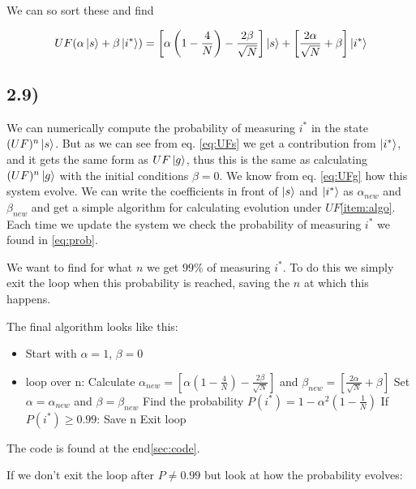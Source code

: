 \documentclass[a4paper,norsk, 10pt]{article}
\begin{document}
We can so sort these and find 

\begin{equation}
UF(\alpha\ket{s} + \beta\ket{i^*}) = \left[\alpha\left(1 - \frac{4}{N}\right) - \frac{2\beta}{\sqrt{N}}\right]\ket{s} + \left[\frac{2\alpha}{\sqrt{N}} + \beta\right]\ket{i^*}
\end{equation}\label{eq:UFg}

\subsection{2.9)}

We can numerically compute the probability of measuring $i^*$ in the state $(UF)^n\ket{s}$. But as we can see from eq. \eqref{eq:UFs} we get a contribution from $\ket{i^*}$, and it gets the same form as $UF\ket{g}$, thus this is the same as calculating $(UF)^n\ket{g}$ with the initial conditions $\beta = 0$. We know from eq. \ref{eq:UFg} how this system evolve. We can write the coefficients in front of $\ket{s}$ and $\ket{i^*}$ as $\alpha_{new}$ and $\beta_{new}$ and get a simple algorithm for calculating evolution under $UF$\eqref{item:algo}. Each time we update the system we check the probability of measuring $i^*$ we found in \eqref{eq:prob}.

We want to find for what $n$ we get $99\%$ of measuring $i^*$. To do this we simply exit the loop when this probability is reached, saving the $n$ at which this happens.

The final algorithm looks like this:

\begin{itemize}\label{item:algo}
\item Start with $\alpha = 1$, $\beta = 0$
\item loop over n:
\subitem Calculate $\alpha_{new} = \left[\alpha\left(1 - \frac{4}{N}\right) - \frac{2\beta}{\sqrt{N}}\right]$ and $\beta_{new} = \left[\frac{2\alpha}{\sqrt{N}} + \beta\right]$
\subitem Set $\alpha = \alpha_{new}$ and $\beta = \beta_{new}$
\subitem Find the probability $P(i^*) = 1 - \alpha^2\left(1 - \frac{1}{N}\right)$
\subitem If $P(i^*) \geq 0.99$:
\subsubitem Save n
\subsubitem Exit loop
\end{itemize}

The code is found at the end\ref{sec:code}.


If we don't exit the loop after $P \neq 0.99$ but look at how the probability evolves:
\end{document}
